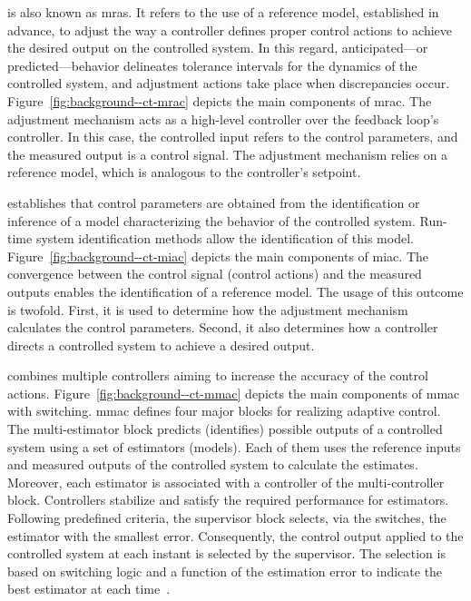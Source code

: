\begin{description}[style=unboxed,leftmargin=0em,font=\normalsize\bfseries]
	\item[\glsentryfull{mrac}] is also known as \gls{mras}. It refers to the use of a reference model, established in advance, to adjust the way a controller defines proper control actions to achieve the desired output on the controlled system. In this regard, anticipated---or predicted---behavior delineates tolerance intervals for the dynamics of the controlled system, and adjustment actions take place when discrepancies occur. Figure~\ref{fig:background--ct-mrac} depicts the main components of \gls{mrac}. The adjustment mechanism acts as a high-level controller over the feedback loop's controller. In this case, the controlled input refers to the control parameters, and the measured output is a control signal. The adjustment mechanism relies on a reference model, which is analogous to the controller's setpoint.

	\item[\glsentryfull{miac}] establishes that control parameters are obtained from the identification or inference of a model characterizing the behavior of the controlled system. Run-time system identification methods allow the identification of this model. Figure~\ref{fig:background--ct-miac} depicts the main components of \gls{miac}. The convergence between the control signal (control actions) and the measured outputs enables the identification of a reference model. The usage of this outcome is twofold. First, it is used to determine how the adjustment mechanism calculates the control parameters. Second, it also determines how a controller directs a controlled system to achieve a desired output.

	\item[\glsentryfull{mmac}] combines multiple controllers aiming to increase the accuracy of the control actions. Figure~\ref{fig:background--ct-mmac} depicts the main components of \gls{mmac} with switching. \gls{mmac} defines four major blocks for realizing adaptive control. The multi-estimator block predicts (identifies) possible outputs of a controlled system using a set of estimators (models). Each of them uses the reference inputs and measured outputs of the controlled system to calculate the estimates. Moreover, each estimator is associated with a controller of the multi-controller block. Controllers stabilize and satisfy the required performance for estimators. Following predefined criteria, the supervisor block selects, via the switches, the estimator with the smallest error. Consequently, the control output applied to the controlled system at each instant is selected by the supervisor. The selection is based on switching logic and a function of the estimation error to indicate the best estimator at each time~\cite{landau-2011-multimodel}.
\end{description}


